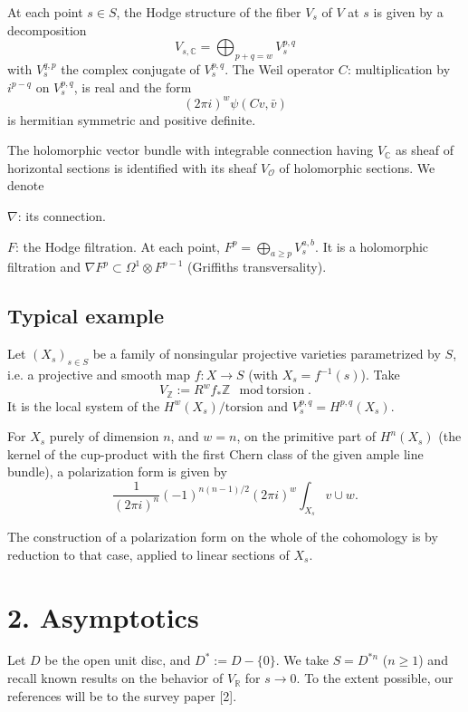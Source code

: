 \documentclass[11pt,a4paper]{article}
\theoremstyle{plain}
\theoremstyle{definition}
\begin{document}
At each point $s \in S$, the Hodge structure of the fiber $V_{s}$ of $V$ at $s$ is given by a decomposition
\[
V_{s,\mathbb{C}} = \bigoplus_{p+q=w} V_{s}^{p,q}
\]
with $V_{s}^{q,p}$ the complex conjugate of $V_{s}^{p,q}$. The Weil operator $C$: multiplication by $i^{p-q}$ on $V_{s}^{p,q}$, is real and the form
\[
(2\pi i)^{w}\psi(Cv,\bar{v})
\]
is hermitian symmetric and positive definite.

The holomorphic vector bundle with integrable connection having $V_{\mathbb{C}}$ as sheaf of horizontal sections is identified with its sheaf $V_{\mathcal{O}}$ of holomorphic sections. We denote

$\nabla$: its connection.

$F$: the Hodge filtration. At each point, $F^{p} = \bigoplus_{a \geq p} V_{s}^{a,b}$. It is a holomorphic filtration and $\nabla F^{p} \subset \Omega^{1} \otimes F^{p-1}$ (Griffiths transversality).

\subsection*{Typical example}

Let $(X_{s})_{s \in S}$ be a family of nonsingular projective varieties parametrized by $S$, i.e. a projective and smooth map $f: X \to S$ (with $X_{s} = f^{-1}(s)$). Take
\[
V_{\mathbb{Z}} := R^{w}f_{*}\mathbb{Z} \mod \text{torsion}.
\]
It is the local system of the $H^{w}(X_{s})/\text{torsion}$ and $V_{s}^{p,q} = H^{p,q}(X_{s})$.

For $X_{s}$ purely of dimension $n$, and $w=n$, on the primitive part of $H^{n}(X_{s})$ (the kernel of the cup-product with the first Chern class of the given ample line bundle), a polarization form is given by
\[
\frac{1}{(2\pi i)^{n}}(-1)^{n(n-1)/2}(2\pi i)^{w}\int_{X_{s}} v \cup w.
\]

The construction of a polarization form on the whole of the cohomology is by reduction to that case, applied to linear sections of $X_{s}$.

\section{2. Asymptotics}

Let $D$ be the open unit disc, and $D^{*} := D - \{0\}$. We take $S = D^{*n}$ ($n \geq 1$) and recall known results on the behavior of $V_{\mathbb{R}}$ for $s \to 0$. To the extent possible, our references will be to the survey paper [2].
\end{document}
